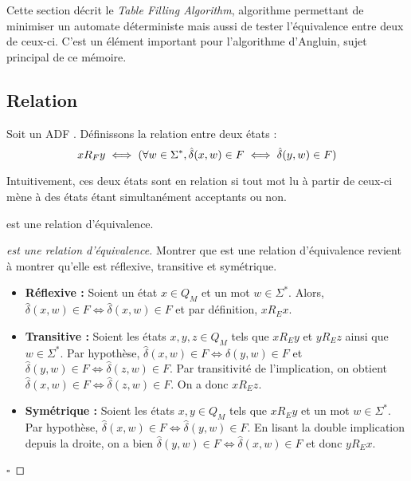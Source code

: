 Cette section décrit le \emph{Table Filling Algorithm}, algorithme permettant de minimiser un automate déterministe mais aussi de tester l'équivalence entre deux de ceux-ci. C'est un élément important pour l'algorithme d'Angluin, sujet principal de ce mémoire.




\subsection{Relation \rf}\label{ss:re}

Soit un ADF \automaton. Définissons la relation \rf entre deux états :
$$xR_Fy \iff (\forall w \in \Sigma^*,\hat{\delta}(x,w) \in F \iff \hat{\delta}(y,w) \in F)$$

Intuitivement, ces deux états sont en relation si tout mot lu à partir de ceux-ci mène à des états étant simultanément acceptants ou non.

\begin{proposition}[\rf]
 \rf est une relation d'équivalence.
\end{proposition}

\begin{proof}[\rf est une relation d'équivalence] Montrer que \rf est une relation d'équivalence revient à montrer qu'elle est réflexive, transitive et symétrique.
 \begin{itemize}
	 \item \textbf{Réflexive :} Soient un état $x \in Q_M$ et un mot $w \in \Sigma^*$. Alors, $\hat{\delta}(x,w) \in F \iff \hat{\delta}(x,w) \in F$ et par définition, $xR_Ex$.
	 \item \textbf{Transitive :} Soient les états $x,y,z \in Q_M$ tels que $xR_Ey$ et $yR_Ez$ ainsi que $w \in \Sigma^*$. Par hypothèse, $\hat{\delta}(x,w) \in F \iff \hat{\delta}(y,w)\in F$ et $\hat{\delta}(y,w) \in F\iff \hat{\delta}(z,w) \in F$. Par transitivité de l'implication, on obtient $\hat{\delta}(x,w) \in F \iff \hat{\delta}(z,w)\in F$. On a donc $xR_Ez$.
	 \item \textbf{Symétrique : } Soient les états $x,y \in Q_M$ tels que $xR_Ey$ et un mot $w \in \Sigma^*$. Par hypothèse, $\hat{\delta}(x, w)\in F \iff \hat{\delta}(y, w)\in F$. En lisant la double implication depuis la droite, on a bien $\hat{\delta}(y, w) \in F\iff \hat{\delta}(x, w)\in F$ et donc $yR_Ex$.
 \end{itemize}
 \hfill$\square$
\end{proof}

